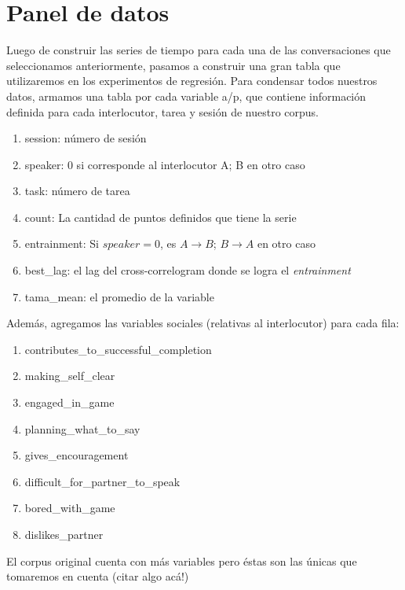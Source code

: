 \section{Panel de datos}
\label{sec:panel_data}


Luego de construir las series de tiempo para cada una de las conversaciones que seleccionamos anteriormente, pasamos a construir una gran tabla que utilizaremos en los experimentos de regresión. Para condensar todos nuestros datos, armamos una tabla por cada variable a/p, que contiene información definida para cada interlocutor, tarea y sesión de nuestro corpus.

\begin{enumerate}
  \item session: número de sesión
  \item speaker: 0 si corresponde al interlocutor A; B en otro caso
  \item task: número de tarea
  \item count: La cantidad de puntos definidos que tiene la serie
  \item entrainment: Si $speaker=0$, es $A\rightarrow B$; $B \rightarrow A$ en otro caso
  \item best\_lag: el lag del cross-correlogram donde se logra el \emph{entrainment}
  \item tama\_mean: el promedio de la variable
\end{enumerate}

Además, agregamos las variables sociales (relativas al interlocutor) para cada fila:

\begin{enumerate}
\item contributes\_to\_successful\_completion
\item making\_self\_clear
\item engaged\_in\_game
\item planning\_what\_to\_say
\item gives\_encouragement
\item difficult\_for\_partner\_to\_speak
\item bored\_with\_game
\item dislikes\_partner
\end{enumerate}

El corpus original cuenta con más variables pero éstas son las únicas que tomaremos en cuenta (citar algo acá!)


